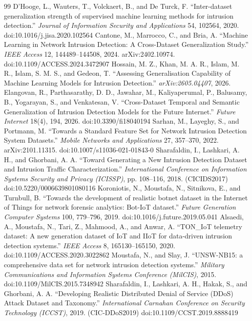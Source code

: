 \documentclass[preprint,12pt,nopreprintline]{elsarticle}
\begin{document}
\begin{thebibliography}{99}
 D'Hooge, L., Wauters, T., Volckaert, B., and De Turck, F. ``Inter-dataset generalization strength of supervised machine learning methods for intrusion detection.'' \emph{Journal of Information Security and Applications} 54, 102564, 2020. doi:10.1016/j.jisa.2020.102564
 Cantone, M., Marrocco, C., and Bria, A. ``Machine Learning in Network Intrusion Detection: A Cross-Dataset Generalization Study.'' \emph{IEEE Access} 12, 144489--144508, 2024. arXiv:2402.10974. doi:10.1109/ACCESS.2024.3472907
 Hossain, M. Z., Khan, M. A. R., Islam, M. R., Islam, S. M. S., and Gedeon, T. ``Assessing Generalisation Capability of Machine Learning Models for Intrusion Detection.'' \emph{arXiv:2605.04407}, 2026.
 Elangovan, R., Parthasarathy, D. D., Jawahar, M., Kaliyaperumal, P., Balusamy, B., Yogarayan, S., and Venkatesan, V. ``Cross-Dataset Temporal and Semantic Generalization of Intrusion Detection Models for the Future Internet.'' \emph{Future Internet} 18(4), 194, 2026. doi:10.3390/fi18040194
 Sarhan, M., Layeghy, S., and Portmann, M. ``Towards a Standard Feature Set for Network Intrusion Detection System Datasets.'' \emph{Mobile Networks and Applications} 27, 357--370, 2022. arXiv:2101.11315. doi:10.1007/s11036-021-01843-0
 Sharafaldin, I., Lashkari, A. H., and Ghorbani, A. A. ``Toward Generating a New Intrusion Detection Dataset and Intrusion Traffic Characterization.'' \emph{International Conference on Information Systems Security and Privacy (ICISSP)}, pp. 108--116, 2018. (CICIDS2017) doi:10.5220/0006639801080116
 Koroniotis, N., Moustafa, N., Sitnikova, E., and Turnbull, B. ``Towards the development of realistic botnet dataset in the Internet of Things for network forensic analytics: Bot-IoT dataset.'' \emph{Future Generation Computer Systems} 100, 779--796, 2019. doi:10.1016/j.future.2019.05.041
 Alsaedi, A., Moustafa, N., Tari, Z., Mahmood, A., and Anwar, A. ``TON\_IoT telemetry dataset: A new generation dataset of IoT and IIoT for data-driven intrusion detection systems.'' \emph{IEEE Access} 8, 165130--165150, 2020. doi:10.1109/ACCESS.2020.3022862
 Moustafa, N., and Slay, J. ``UNSW-NB15: a comprehensive data set for network intrusion detection systems.'' \emph{Military Communications and Information Systems Conference (MilCIS)}, 2015. doi:10.1109/MilCIS.2015.7348942
 Sharafaldin, I., Lashkari, A. H., Hakak, S., and Ghorbani, A. A. ``Developing Realistic Distributed Denial of Service (DDoS) Attack Dataset and Taxonomy.'' \emph{International Carnahan Conference on Security Technology (ICCST)}, 2019. (CIC-DDoS2019) doi:10.1109/CCST.2019.8888419

\end{thebibliography}
\end{document}
